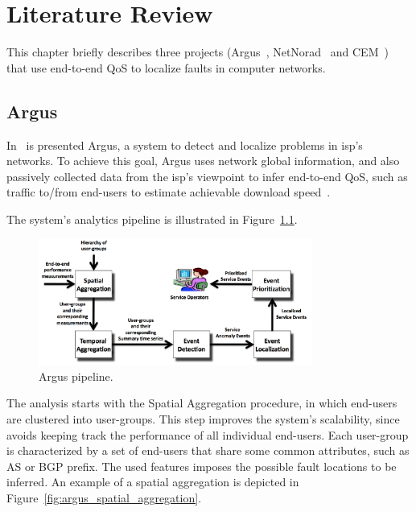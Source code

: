 \chapter{Literature Review}
\label{chap:literature_review}

This chapter briefly describes three projects
(Argus~\cite{argus_end_to_end_service_anomaly_detection_and_localization_from_an_isps_point_of_view},
NetNorad~\cite{netnorad}
and CEM~\cite{crowdsourcing_service_level_network_event_monitoring})
that use end-to-end QoS to localize faults in computer networks.

\section{Argus}

In~\cite{argus_end_to_end_service_anomaly_detection_and_localization_from_an_isps_point_of_view}
is presented Argus, a system to
detect and localize problems in \gls*{isp}'s networks. To achieve this goal, Argus uses
network global information, and also passively collected data from the \gls*{isp}'s
viewpoint to infer
end-to-end QoS, such as traffic to/from end-users to estimate achievable
download
speed~\cite{speed_testing_without_speed_tests_estimating_achievable_download_speed_from_passive_measurements}.

The system's analytics pipeline is illustrated in
Figure~\ref{fig:argus_pipeline}.

\begin{figure}[H]
    \centering
    \includegraphics[width=0.8\textwidth]{./figures/literature_review/argus_pipeline.png}
    \caption{Argus pipeline.~\cite{argus_end_to_end_service_anomaly_detection_and_localization_from_an_isps_point_of_view}}
\label{fig:argus_pipeline}
\end{figure}%

The analysis starts with the Spatial Aggregation procedure, in which
end-users are clustered into user-groups. This step improves the system's
scalability, since avoids keeping track the performance of all
individual end-users.
Each user-group is characterized by a set of end-users that share some common
attributes, such as AS or BGP prefix. The used features imposes the possible
fault locations to be inferred.
An example of a spatial aggregation is depicted in
Figure~\ref{fig:argus_spatial_aggregation}.

